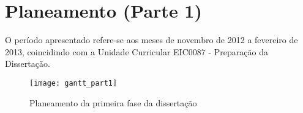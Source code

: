 \chapter{Planeamento (Parte 1)} \label{gantt1}

O período apresentado refere-se aos meses de novembro de 2012 a fevereiro de 2013, coincidindo com a Unidade Curricular EIC0087 - Preparação da Dissertação.

\begin{figure}[t]
  \begin{center}
    \leavevmode
    \texttt{[image: gantt\_part1]}
    \caption{Planeamento da primeira fase da dissertação}
    \label{fig:gantt1}
  \end{center}
\end{figure}
